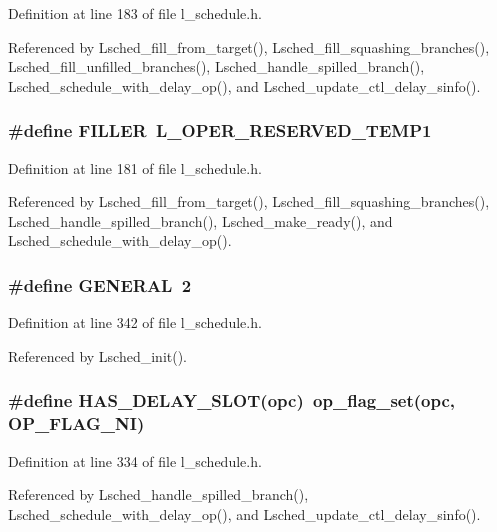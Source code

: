 Definition at line 183 of file l\_\-schedule.h.

Referenced by Lsched\_\-fill\_\-from\_\-target(), Lsched\_\-fill\_\-squashing\_\-branches(), Lsched\_\-fill\_\-unfilled\_\-branches(), Lsched\_\-handle\_\-spilled\_\-branch(), Lsched\_\-schedule\_\-with\_\-delay\_\-op(), and Lsched\_\-update\_\-ctl\_\-delay\_\-sinfo().
\subsubsection{\setlength{\rightskip}{0pt plus 5cm}\#define FILLER~L\_\-OPER\_\-RESERVED\_\-TEMP1}\label{l__schedule_8h_6b05dd372c722a88dc8ee967ca69853e}




Definition at line 181 of file l\_\-schedule.h.

Referenced by Lsched\_\-fill\_\-from\_\-target(), Lsched\_\-fill\_\-squashing\_\-branches(), Lsched\_\-handle\_\-spilled\_\-branch(), Lsched\_\-make\_\-ready(), and Lsched\_\-schedule\_\-with\_\-delay\_\-op().
\subsubsection{\setlength{\rightskip}{0pt plus 5cm}\#define GENERAL~2}\label{l__schedule_8h_437af5f01218b7f90764a1353dd15289}




Definition at line 342 of file l\_\-schedule.h.

Referenced by Lsched\_\-init().
\subsubsection{\setlength{\rightskip}{0pt plus 5cm}\#define HAS\_\-DELAY\_\-SLOT(opc)~op\_\-flag\_\-set(opc, OP\_\-FLAG\_\-NI)}\label{l__schedule_8h_3894c07e0b8385285e924410a40a219e}




Definition at line 334 of file l\_\-schedule.h.

Referenced by Lsched\_\-handle\_\-spilled\_\-branch(), Lsched\_\-schedule\_\-with\_\-delay\_\-op(), and Lsched\_\-update\_\-ctl\_\-delay\_\-sinfo().
